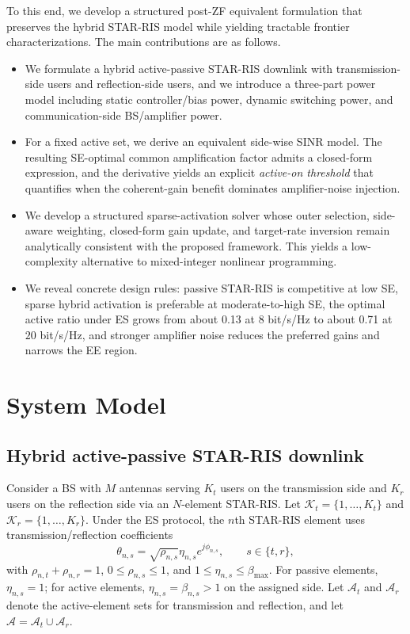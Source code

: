 \documentclass[journal]{IEEEtran}
\begin{document}
To this end, we develop a structured post-ZF equivalent formulation that preserves the hybrid STAR-RIS model while yielding tractable frontier characterizations. The main contributions are as follows.
\begin{itemize}
    \item We formulate a hybrid active-passive STAR-RIS downlink with transmission-side users and reflection-side users, and we introduce a three-part power model including static controller/bias power, dynamic switching power, and communication-side BS/amplifier power.
    \item For a fixed active set, we derive an equivalent side-wise SINR model. The resulting SE-optimal common amplification factor admits a closed-form expression, and the derivative yields an explicit \emph{active-on threshold} that quantifies when the coherent-gain benefit dominates amplifier-noise injection.
    \item We develop a structured sparse-activation solver whose outer selection, side-aware weighting, closed-form gain update, and target-rate inversion remain analytically consistent with the proposed framework. This yields a low-complexity alternative to mixed-integer nonlinear programming.
    \item We reveal concrete design rules: passive STAR-RIS is competitive at low SE, sparse hybrid activation is preferable at moderate-to-high SE, the optimal active ratio under ES grows from about 0.13 at $8$ bit/s/Hz to about 0.71 at $20$ bit/s/Hz, and stronger amplifier noise reduces the preferred gains and narrows the EE region.
\end{itemize}

\section{System Model}
\subsection{Hybrid active-passive STAR-RIS downlink}
Consider a BS with $M$ antennas serving $K_t$ users on the transmission side and $K_r$ users on the reflection side via an $N$-element STAR-RIS. Let $\mathcal{K}_t=\{1,\ldots,K_t\}$ and $\mathcal{K}_r=\{1,\ldots,K_r\}$. Under the ES protocol, the $n$th STAR-RIS element uses transmission/reflection coefficients
\begin{equation}
\theta_{n,s}=\sqrt{\rho_{n,s}}\eta_{n,s}e^{j\phi_{n,s}},\qquad s\in\{t,r\},
\label{eq:theta}
\end{equation}
with $\rho_{n,t}+\rho_{n,r}=1$, $0\le \rho_{n,s}\le 1$, and $1\le \eta_{n,s}\le \beta_{\max}$. For passive elements, $\eta_{n,s}=1$; for active elements, $\eta_{n,s}=\beta_{n,s}>1$ on the assigned side. Let $\mathcal{A}_t$ and $\mathcal{A}_r$ denote the active-element sets for transmission and reflection, and let $\mathcal{A}=\mathcal{A}_t\cup\mathcal{A}_r$.
\end{document}
